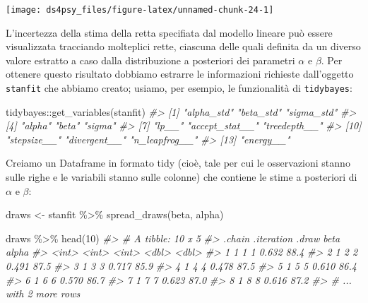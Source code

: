 \documentclass[
  11pt,
]{krantz}
\makeatletter
\newenvironment{Shaded}{\begin{snugshade}}{\end{snugshade}}
\newcommand{\CommentTok}[1]{\textcolor[rgb]{0.37,0.37,0.37}{\textit{#1}}}
\newcommand{\DecValTok}[1]{\textcolor[rgb]{0.06,0.06,0.06}{#1}}
\newcommand{\FunctionTok}[1]{\textcolor[rgb]{0,0,0}{#1}}
\newcommand{\NormalTok}[1]{#1}
\newcommand{\OtherTok}[1]{\textcolor[rgb]{0.37,0.37,0.37}{#1}}
\newcommand{\SpecialCharTok}[1]{\textcolor[rgb]{0,0,0}{#1}}
\newenvironment{kframe}{%
\medskip{}
\setlength{\fboxsep}{.8em}
 \def\at@end@of@kframe{}%
 \ifinner\ifhmode%
  \def\at@end@of@kframe{\end{minipage}}%
  \begin{minipage}{\columnwidth}%
 \fi\fi%
 \def\FrameCommand##1{\hskip\@totalleftmargin \hskip-\fboxsep
 \colorbox{shadecolor}{##1}\hskip-\fboxsep
     \hskip-\linewidth \hskip-\@totalleftmargin \hskip\columnwidth}%
 \MakeFramed {\advance\hsize-\width
   \@totalleftmargin\z@ \linewidth\hsize
   \@setminipage}}%
 {\par\unskip\endMakeFramed%
 \at@end@of@kframe}
\renewenvironment{Shaded}{\begin{kframe}}{\end{kframe}}
\theoremstyle{definition}
\theoremstyle{definition}
\theoremstyle{definition}
\theoremstyle{definition}
\theoremstyle{remark}
\makeatother
\begin{document}
\begin{center}\texttt{[image: ds4psy\_files/figure-latex/unnamed-chunk-24-1]} \end{center}

L'incertezza della stima della retta specifiata dal modello lineare può essere visualizzata tracciando molteplici rette, ciascuna delle quali definita da un diverso valore estratto a caso dalla distribuzione a posteriori dei parametri \(\alpha\) e \(\beta\). Per ottenere questo risultato dobbiamo estrarre le informazioni richieste dall'oggetto \texttt{stanfit} che abbiamo creato; usiamo, per esempio, le funzionalità di \texttt{tidybayes}:

\begin{Shaded}
\begin{Highlighting}[]
\NormalTok{tidybayes}\SpecialCharTok{::}\FunctionTok{get\_variables}\NormalTok{(stanfit)}
\CommentTok{\#\textgreater{}  [1] "alpha\_std"     "beta\_std"      "sigma\_std"    }
\CommentTok{\#\textgreater{}  [4] "alpha"         "beta"          "sigma"        }
\CommentTok{\#\textgreater{}  [7] "lp\_\_"          "accept\_stat\_\_" "treedepth\_\_"  }
\CommentTok{\#\textgreater{} [10] "stepsize\_\_"    "divergent\_\_"   "n\_leapfrog\_\_" }
\CommentTok{\#\textgreater{} [13] "energy\_\_"}
\end{Highlighting}
\end{Shaded}

Creiamo un Dataframe in formato tidy (cioè, tale per cui le osservazioni stanno sulle righe e le variabili stanno sulle colonne) che contiene le stime a posteriori di \(\alpha\) e \(\beta\):

\begin{Shaded}
\begin{Highlighting}[]
\NormalTok{draws }\OtherTok{\textless{}{-}}\NormalTok{ stanfit }\SpecialCharTok{\%\textgreater{}\%}
  \FunctionTok{spread\_draws}\NormalTok{(beta, alpha)}
\end{Highlighting}
\end{Shaded}

\begin{Shaded}
\begin{Highlighting}[]
\NormalTok{draws }\SpecialCharTok{\%\textgreater{}\%}
  \FunctionTok{head}\NormalTok{(}\DecValTok{10}\NormalTok{)}
\CommentTok{\#\textgreater{} \# A tibble: 10 x 5}
\CommentTok{\#\textgreater{}   .chain .iteration .draw  beta alpha}
\CommentTok{\#\textgreater{}    \textless{}int\textgreater{}      \textless{}int\textgreater{} \textless{}int\textgreater{} \textless{}dbl\textgreater{} \textless{}dbl\textgreater{}}
\CommentTok{\#\textgreater{} 1      1          1     1 0.632  88.4}
\CommentTok{\#\textgreater{} 2      1          2     2 0.491  87.5}
\CommentTok{\#\textgreater{} 3      1          3     3 0.717  85.9}
\CommentTok{\#\textgreater{} 4      1          4     4 0.478  87.5}
\CommentTok{\#\textgreater{} 5      1          5     5 0.610  86.4}
\CommentTok{\#\textgreater{} 6      1          6     6 0.570  86.7}
\CommentTok{\#\textgreater{} 7      1          7     7 0.623  87.0}
\CommentTok{\#\textgreater{} 8      1          8     8 0.616  87.2}
\CommentTok{\#\textgreater{} \# ... with 2 more rows}
\end{Highlighting}
\end{Shaded}
\end{document}
